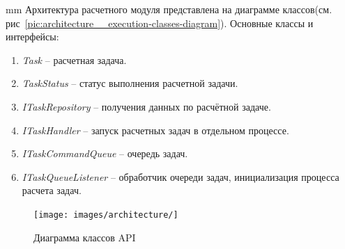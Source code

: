  mm
Архитектура расчетного модуля представлена на диаграмме классов(см. рис\ \ref{pic:architecture__execution-classes-diagram}).
Основные классы и интерфейсы:
\begin{enumerate}
	\item \textit{Task} -- расчетная задача.
	\item \textit{TaskStatus} -- статус выполнения расчетной задачи.
	\item \textit{ITaskRepository} -- получения данных по расчётной задаче.
	\item \textit{ITaskHandler} -- запуск расчетных задач в отдельном процессе.
	\item \textit{ITaskCommandQueue} -- очередь задач.
	\item \textit{ITaskQueueListener} -- обработчик очереди задач, инициализация процесса расчета задач.
\end{enumerate}


\begin{figure}[H]
	\hspace*{-2.5 cm}\texttt{[image: images/architecture/]}
	\caption{Диаграмма классов API}
	\label{pic:architecture__api-classes-diagram}
\end{figure}
